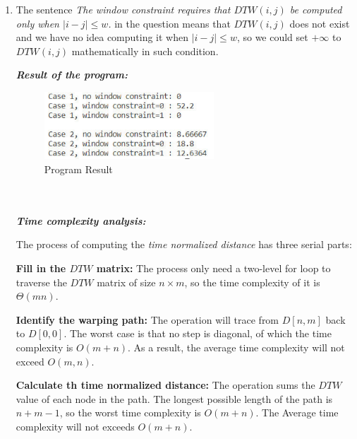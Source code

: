 \documentclass[12pt,a4paper]{article}
\makeatletter
\newtheorem*{solution}{Solution}
\theoremstyle{definition}
\renewenvironment{solution}[1][Solution] {\par\pushQED{\qed}\normalfont\topsep6\p@\@plus6\p@\relax\trivlist\item[\hskip\labelsep\bfseries#1\@addpunct{.}]\ignorespaces}{\popQED\endtrivlist\@endpefalse} \makeatother
\makeatother
\begin{document}
\begin{enumerate}
\begin{solution}
\begin{enumerate}
		        The sentence \textit{The window constraint requires that $DTW(i, j)$ be computed only when $|i-j| \leq w$.} in the question means that $DTW(i,j)$ does not exist and we have no idea computing it when $|i-j|\leq w$, so we could set $+\infty$ to $DTW(i,j)$ mathematically in such condition.
		    \end{enumerate}
		    \textbf{\textit{Result of the program:}}
		    \begin{figure}[htbp]
                \centering 
                \includegraphics[width=0.6\textwidth]{Fig-Result2.pdf}
                \caption{Program Result}\label{Fig-Result}
            \end{figure}
            \\
            \\
		    \textbf{\textit{Time complexity analysis:}}
		    
		    The process of computing the \emph{time normalized distance} has three serial parts:

		        \textbf{Fill in the $DTW$ matrix:} The process only need a two-level for loop to traverse the $DTW$ matrix of size $n\times m$, so the time complexity of it is $\Theta(mn)$.
		        
		        \textbf{Identify the warping path:} The operation will trace from $D[n,m]$ back to $D[0,0]$. The worst case is that no step is diagonal, of which the time complexity is $O(m+n)$. As a result, the average time complexity will not exceed $O(m,n)$.
		        
		        \textbf{Calculate th time normalized distance:} The operation sums the $DTW$ value of each node in the path. The longest possible length of the path is $n+m-1$, so the worst time complexity is $O(m+n)$. The Average time complexity will not exceeds $O(m+n)$.
		        

\end{solution}
\end{enumerate}
\end{document}
